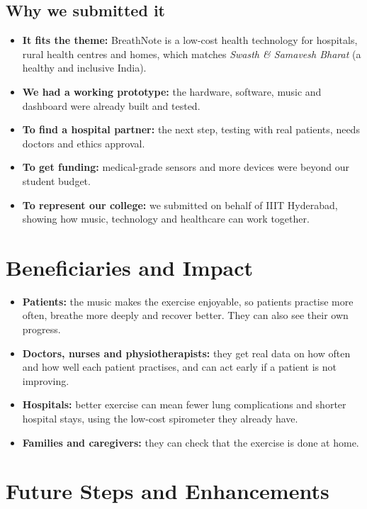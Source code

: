 \documentclass[12pt,a4paper]{article}
\begin{document}
\subsection{Why we submitted it}
\begin{itemize}
  \item \textbf{It fits the theme:} BreathNote is a low-cost health technology for hospitals, rural health centres and homes, which matches \emph{Swasth \& Samavesh Bharat} (a healthy and inclusive India).
  \item \textbf{We had a working prototype:} the hardware, software, music and dashboard were already built and tested.
  \item \textbf{To find a hospital partner:} the next step, testing with real patients, needs doctors and ethics approval.
  \item \textbf{To get funding:} medical-grade sensors and more devices were beyond our student budget.
  \item \textbf{To represent our college:} we submitted on behalf of IIIT Hyderabad, showing how music, technology and healthcare can work together.
\end{itemize}

\section{Beneficiaries and Impact}
\label{sec:impact}

\begin{itemize}
  \item \textbf{Patients:} the music makes the exercise enjoyable, so patients practise more often, breathe more deeply and recover better. They can also see their own progress.
  \item \textbf{Doctors, nurses and physiotherapists:} they get real data on how often and how well each patient practises, and can act early if a patient is not improving.
  \item \textbf{Hospitals:} better exercise can mean fewer lung complications and shorter hospital stays, using the low-cost spirometer they already have.
  \item \textbf{Families and caregivers:} they can check that the exercise is done at home.
\end{itemize}

\section{Future Steps and Enhancements}
\label{sec:future}
\end{document}
